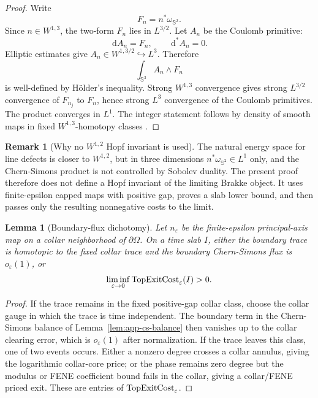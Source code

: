 \documentclass[11pt]{article}
\newtheorem{lemma}[theorem]{Lemma}
\theoremstyle{definition}
\newtheorem{remark}[theorem]{Remark}
\newcommand{\Sph}{\mathbb S}
\newcommand{\dd}{\,\mathrm d}
\newcommand{\eps}{\varepsilon}
\begin{document}
\begin{proof}
Write
\[
        F_n=n^\ast\omega_{\Sph^2}.
\]
Since \(n\in W^{1,3}\), the two-form \(F_n\) lies in \(L^{3/2}\).  Let \(A_n\)
be the Coulomb primitive:
\[
        \dd A_n=F_n,\qquad \dd^\ast A_n=0 .
\]
Elliptic estimates give \(A_n\in W^{1,3/2}\hookrightarrow L^3\).  Therefore
\[
        \int_{\Sph^3}A_n\wedge F_n
\]
is well-defined by H\"older's inequality.  Strong \(W^{1,3}\) convergence gives
strong \(L^{3/2}\) convergence of \(F_{n_j}\) to \(F_n\), hence strong \(L^3\)
convergence of the Coulomb primitives.  The product converges in \(L^1\).  The
integer statement follows by density of smooth maps in fixed
\(W^{1,3}\)-homotopy classes \cite{WhiteSobolevHomotopy}.
\end{proof}

\begin{remark}[Why no \(W^{1,2}\) Hopf invariant is used]
The natural energy space for line defects is closer to \(W^{1,2}\), but in
three dimensions \(n^\ast\omega_{\Sph^2}\in L^1\) only, and the
Chern-Simons product is not controlled by Sobolev duality.  The present proof
therefore does not define a Hopf invariant of the limiting Brakke object.  It
uses finite-epsilon capped maps with positive gap, proves a slab lower bound,
and then passes only the resulting nonnegative costs to the limit.
\end{remark}

\begin{lemma}[Boundary-flux dichotomy]
\label{lem:app-boundary-flux}
Let \(n_\eps\) be the finite-epsilon principal-axis map on a collar
neighborhood of \(\partial\Omega\).  On a time slab \(I\), either the boundary
trace is homotopic to the fixed collar trace and the boundary Chern-Simons flux
is \(o_\eps(1)\), or
\[
        \liminf_{\eps\to0}
        {\rm TopExitCost}_\eps(I)>0 .
\]
\end{lemma}

\begin{proof}
If the trace remains in the fixed positive-gap collar class, choose the collar
gauge in which the trace is time independent.  The boundary term in the
Chern-Simons balance of Lemma~\ref{lem:app-cs-balance} then vanishes up to the
collar clearing error, which is \(o_\eps(1)\) after normalization.  If the
trace leaves this class, one of two events occurs.  Either a nonzero degree
crosses a collar annulus, giving the logarithmic collar-core price; or the
phase remains zero degree but the modulus or FENE coefficient bound fails in
the collar, giving a collar/FENE priced exit.  These are entries of
\({\rm TopExitCost}_\eps\).
\end{proof}
\end{document}
